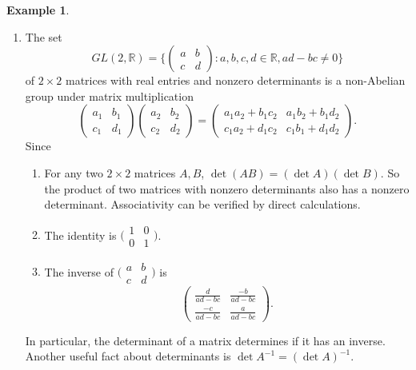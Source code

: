 \documentclass{article}
\theoremstyle{definition}
\newtheorem{example}{Example}[section]
\begin{document}
\begin{example}
\begin{enumerate}
    \item The set 
    \begin{equation*}
        GL(2,\mathbb{R}) = \bigg\{\begin{pmatrix}
            a&b\\c&d
        \end{pmatrix}: a,b,c,d \in \mathbb{R}, ad-bc \neq 0\bigg\}
    \end{equation*}
    of $2\times2$ matrices with real entries and nonzero determinants is a non-Abelian group under matrix multiplication
    \begin{equation*}
        \begin{pmatrix}
            a_1&b_1\\c_1&d_1
        \end{pmatrix}
        \begin{pmatrix}
            a_2&b_2\\c_2&d_2
        \end{pmatrix}
        =
        \begin{pmatrix}
            a_1a_2+b_1c_2&a_1b_2+b_1d_2\\c_1a_2+d_1c_2&c_1b_1+d_1d_2
        \end{pmatrix}.
    \end{equation*}
    Since
    \begin{enumerate}
        \item For any two $2\times2$ matrices $A,B$, $\det (AB)=(\det A)(\det B)$. So the product of two matrices with nonzero determinants also has a nonzero determinant. Associativity can be verified by direct calculations.
        \item The identity is $\big(\begin{smallmatrix}1&0\\0&1 \end{smallmatrix}\big)$.
        \item The inverse of $\big(\begin{smallmatrix} a&b\\c&d \end{smallmatrix}\big)$ is
        \begin{equation*}
            \begin{pmatrix}
                \frac{d}{ad-bc}&\frac{-b}{ad-bc}\\\frac{-c}{ad-bc}&\frac{a}{ad-bc}
            \end{pmatrix}.
        \end{equation*}
    \end{enumerate}
    In particular, the determinant of a matrix determines if it has an inverse. Another useful fact about determinants is $\det A^{-1}=(\det A)^{-1}$.
    

\end{enumerate}
\end{example}
\end{document}
